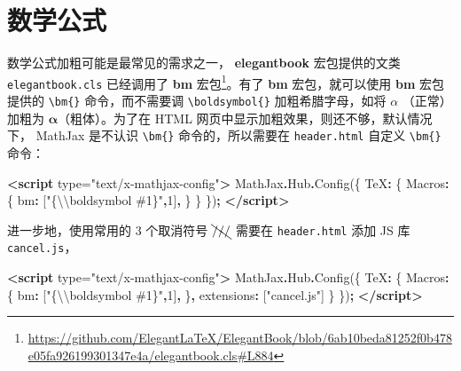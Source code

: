 \documentclass[
  lang=cn,
  11pt,
  scheme=chinese,
  chinesefont=nofont,
  citestyle=gb7714-2015,
  bibstyle=gb7714-2015]{elegantbook}
\newenvironment{Shaded}{\begin{snugshade}}{\end{snugshade}}
\newcommand{\AttributeTok}[1]{\textcolor[rgb]{0.77,0.63,0.00}{#1}}
\newcommand{\DataTypeTok}[1]{\textcolor[rgb]{0.13,0.29,0.53}{#1}}
\newcommand{\DecValTok}[1]{\textcolor[rgb]{0.00,0.00,0.81}{#1}}
\newcommand{\FunctionTok}[1]{\textcolor[rgb]{0.00,0.00,0.00}{#1}}
\newcommand{\KeywordTok}[1]{\textcolor[rgb]{0.13,0.29,0.53}{\textbf{#1}}}
\newcommand{\NormalTok}[1]{#1}
\newcommand{\OperatorTok}[1]{\textcolor[rgb]{0.81,0.36,0.00}{\textbf{#1}}}
\newcommand{\OtherTok}[1]{\textcolor[rgb]{0.56,0.35,0.01}{#1}}
\newcommand{\SpecialCharTok}[1]{\textcolor[rgb]{0.00,0.00,0.00}{#1}}
\newcommand{\StringTok}[1]{\textcolor[rgb]{0.31,0.60,0.02}{#1}}
\begin{document}
\hypertarget{math-formular}{%
\section{数学公式}\label{math-formular}}

数学公式加粗可能是最常见的需求之一， \textbf{elegantbook} 宏包提供的文类 \texttt{elegantbook.cls} 已经调用了 \textbf{bm} 宏包\footnote{\url{https://github.com/ElegantLaTeX/ElegantBook/blob/6ab10beda81252f0b478e05fa926199301347e4a/elegantbook.cls\#L884}}。有了 \textbf{bm} 宏包，就可以使用 \textbf{bm} 宏包提供的 \texttt{\textbackslash{}bm\{\}} 命令，而不需要调 \texttt{\textbackslash{}boldsymbol\{\}} 加粗希腊字母，如将 \(\alpha\) （正常）加粗为 \(\bm{\alpha}\)（粗体）。为了在 HTML 网页中显示加粗效果，则还不够，默认情况下， MathJax 是不认识 \texttt{\textbackslash{}bm\{\}} 命令的，所以需要在 \texttt{header.html} 自定义 \texttt{\textbackslash{}bm\{\}} 命令：

\begin{Shaded}
\begin{Highlighting}[]
\KeywordTok{\textless{}script}\OtherTok{ type=}\StringTok{"text/x{-}mathjax{-}config"}\KeywordTok{\textgreater{}}
\NormalTok{    MathJax}\OperatorTok{.}\AttributeTok{Hub}\OperatorTok{.}\FunctionTok{Config}\NormalTok{(\{}
      \DataTypeTok{TeX}\OperatorTok{:}\NormalTok{ \{}
        \DataTypeTok{Macros}\OperatorTok{:}\NormalTok{ \{}
          \DataTypeTok{bm}\OperatorTok{:}\NormalTok{ [}\StringTok{"\{}\SpecialCharTok{\textbackslash{}\textbackslash{}}\StringTok{boldsymbol \#1\}"}\OperatorTok{,}\DecValTok{1}\NormalTok{]}\OperatorTok{,}
\NormalTok{        \}}
\NormalTok{      \}}
\NormalTok{    \})}\OperatorTok{;}
\KeywordTok{\textless{}/script\textgreater{}}
\end{Highlighting}
\end{Shaded}

进一步地，使用常用的 3 个取消符号 \(\bcancel{///}\) 需要在 \texttt{header.html} 添加 JS 库 \texttt{cancel.js}，

\begin{Shaded}
\begin{Highlighting}[]
\KeywordTok{\textless{}script}\OtherTok{ type=}\StringTok{"text/x{-}mathjax{-}config"}\KeywordTok{\textgreater{}}
\NormalTok{    MathJax}\OperatorTok{.}\AttributeTok{Hub}\OperatorTok{.}\FunctionTok{Config}\NormalTok{(\{}
      \DataTypeTok{TeX}\OperatorTok{:}\NormalTok{ \{}
        \DataTypeTok{Macros}\OperatorTok{:}\NormalTok{ \{}
          \DataTypeTok{bm}\OperatorTok{:}\NormalTok{ [}\StringTok{"\{}\SpecialCharTok{\textbackslash{}\textbackslash{}}\StringTok{boldsymbol \#1\}"}\OperatorTok{,}\DecValTok{1}\NormalTok{]}\OperatorTok{,}
\NormalTok{        \}}\OperatorTok{,}
        \DataTypeTok{extensions}\OperatorTok{:}\NormalTok{ [}\StringTok{"cancel.js"}\NormalTok{]}
\NormalTok{      \}}
\NormalTok{    \})}\OperatorTok{;}
\KeywordTok{\textless{}/script\textgreater{}}
\end{Highlighting}
\end{Shaded}
\end{document}
